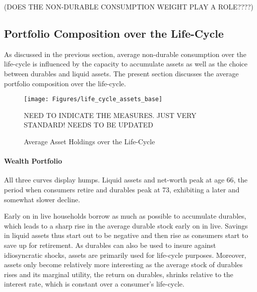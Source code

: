 \documentclass[12pt,a4paper,leqno]{article}
\theoremstyle{definition}
\begin{document}
(DOES THE NON-DURABLE CONSUMPTION WEIGHT PLAY A ROLE????) 

\subsection{Portfolio Composition over the Life-Cycle}
As discussed in the previous section, average non-durable consumption over the life-cycle is influenced by the capacity to accumulate assets as well as the choice between durables and liquid assets. The present section discusses the average portfolio composition over the life-cycle. 

\begin{figure}[!htbp]
\caption{Average Asset Holdings over the Life-Cycle} 
\label{asset_holdings_life_cycle}	%
\centering
\texttt{[image: Figures/life\_cycle\_assets\_base]}  %

\begin{minipage}{0.8\linewidth}
\footnotesize{NEED TO INDICATE THE MEASURES. JUST VERY STANDARD! NEEDS TO BE UPDATED}
\end{minipage}

\end{figure}

\paragraph{Wealth Portfolio} All three curves display humps. Liquid assets and net-worth peak at age 66, the period when consumers retire and durables peak at 73, exhibiting a later and somewhat slower decline. 

Early on in live households borrow as much as possible to accumulate durables, which leads to a sharp rise in the average durable stock early on in live. Savings in liquid assets thus start out to be negative and then rise as consumers start to save up for retirement. As durables can also be used to insure against idiosyncratic shocks, assets are primarily used for life-cycle purposes. Moreover, assets only become relatively more interesting as the average stock of durables rises and its marginal utility, the return on durables, shrinks relative to the interest rate, which is constant over a consumer's life-cycle.
\end{document}
